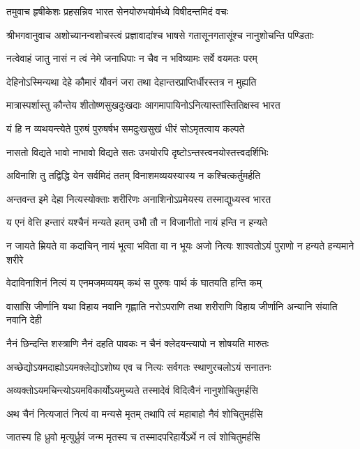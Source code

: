 \twolineshloka
{तमुवाच हृषीकेशः प्रहसन्निव भारत}
{सेनयोरुभयोर्मध्ये विषीदन्तमिदं वचः}%

{श्रीभगवानुवाच}
\twolineshloka
{अशोच्यानन्वशोचस्त्वं प्रज्ञावादांश्च भाषसे}
{गतासूनगतासूंश्च नानुशोचन्ति पण्डिताः}%

\twolineshloka
{नत्वेवाहं जातु नासं न त्वं नेमे जनाधिपाः}
{न चैव न भविष्यामः सर्वे वयमतः परम्}%

\twolineshloka
{देहिनोऽस्मिन्यथा देहे कौमारं यौवनं जरा}
{तथा देहान्तरप्राप्तिर्धीरस्तत्र न मुह्यति}%

\twolineshloka
{मात्रास्पर्शास्तु कौन्तेय शीतोष्णसुखदुःखदाः}
{आगमापायिनोऽनित्यास्तांस्तितिक्षस्व भारत}%

\twolineshloka
{यं हि न व्यथयन्त्येते पुरुषं पुरुषर्षभ}
{समदुःखसुखं धीरं सोऽमृतत्वाय कल्पते}%

\twolineshloka
{नासतो विद्यते भावो नाभावो विद्यते सतः}
{उभयोरपि दृष्टोऽन्तस्त्वनयोस्तत्त्वदर्शिभिः}%

\twolineshloka
{अविनाशि तु तद्विद्धि येन सर्वमिदं ततम्}
{विनाशमव्ययस्यास्य न कश्चित्कर्तुमर्हति}%

\twolineshloka
{अन्तवन्त इमे देहा नित्यस्योक्ताः शरीरिणः}
{अनाशिनोऽप्रमेयस्य तस्माद्युध्यस्व भारत}%

\twolineshloka
{य एनं वेत्ति हन्तारं यश्चैनं मन्यते हतम्}
{उभौ तौ न विजानीतो नायं हन्ति न हन्यते}%

\fourlineindentedshloka
{न जायते म्रियते वा कदाचिन्}
{नायं भूत्वा भविता वा न भूयः}
{अजो नित्यः शाश्वतोऽयं पुराणो}
{न हन्यते हन्यमाने शरीरे}%

\twolineshloka
{वेदाविनाशिनं नित्यं य एनमजमव्ययम्}
{कथं स पुरुषः पार्थ कं घातयति हन्ति कम्}%

\fourlineindentedshloka
{वासांसि जीर्णानि यथा विहाय}
{नवानि गृह्णाति नरोऽपराणि}
{तथा शरीराणि विहाय जीर्णानि}
{अन्यानि संयाति नवानि देही}%

\twolineshloka
{नैनं छिन्दन्ति शस्त्राणि नैनं दहति पावकः}
{न चैनं क्लेदयन्त्यापो न शोषयति मारुतः}%

\twolineshloka
{अच्छेद्योऽयमदाह्योऽयमक्लेद्योऽशोष्य एव च}
{नित्यः सर्वगतः स्थाणुरचलोऽयं सनातनः}%

\twolineshloka
{अव्यक्तोऽयमचिन्त्योऽयमविकार्योऽयमुच्यते}
{तस्मादेवं विदित्वैनं नानुशोचितुमर्हसि}%

\twolineshloka
{अथ चैनं नित्यजातं नित्यं वा मन्यसे मृतम्}
{तथापि त्वं महाबाहो नैवं शोचितुमर्हसि}%

\twolineshloka
{जातस्य हि ध्रुवो मृत्युर्ध्रुवं जन्म मृतस्य च}
{तस्मादपरिहार्येऽर्थे न त्वं शोचितुमर्हसि}%


